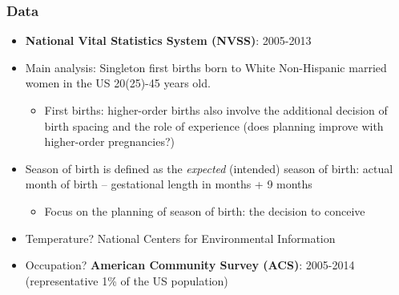 \documentclass[10pt,letterpaper,subeqn]{beamer}
\begin{document}
\begin{frame}
\frametitle{Data}
\begin{itemize}
\item \textbf{National Vital Statistics System (NVSS)}: 2005-2013
\item Main analysis: Singleton first births born to White Non-Hispanic married women in the US 20(25)-45 years old.
\begin{itemize}
\item First births: higher-order births also involve the additional decision of birth spacing and the role of experience (does planning improve with higher-order pregnancies?)
\end{itemize}
\item Season of birth is defined as the \emph{expected} (intended) season of birth: actual month of birth --  gestational length in months + 9 months
\begin{itemize}
\item Focus on the planning of season of birth: the decision to conceive
\end{itemize}
\item Temperature? National Centers for Environmental Information
\item Occupation? \textbf{American Community Survey (ACS)}: 2005-2014 (representative 1\% of the US population)
\end{itemize}
\end{frame}

\end{document}
